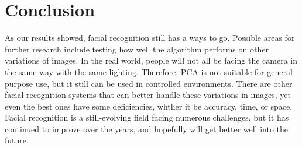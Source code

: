 \documentclass[letterpaper]{article}
\begin{document}
\section{Conclusion}
As our results showed, facial recognition still has a ways to go. Possible areas for further research include testing how well the algorithm performs on other variations of images.  In the real world, people will not all be facing the camera in the same way with the same lighting.  Therefore, PCA is not suitable for general-purpose use, but it still can be used in controlled environments.  There are other facial recognition systems that can better handle these variations in images, yet even the best ones have some deficiencies, whther it be accuracy, time, or space.  Facial recognition is a still-evolving field facing numerous challenges, but it has continued to improve over the years, and hopefully will get better well into the future.


\end{document}
